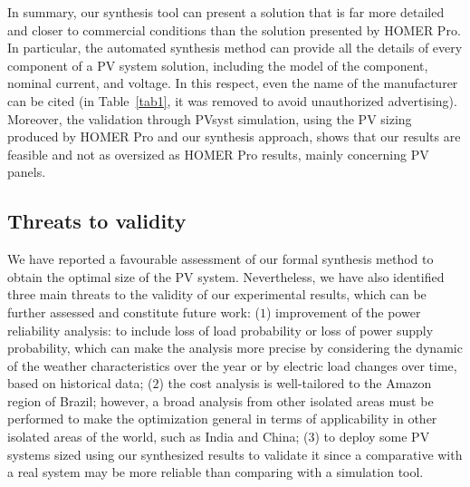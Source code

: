 \documentclass[journal]{IEEEtran}
\begin{document}
In summary, our synthesis tool can present a solution that is far more detailed and closer to commercial conditions than the solution presented by HOMER Pro. In particular, the automated synthesis method can provide all the details of every component of a PV system solution, including the model of the component, nominal current, and voltage. In this respect, even the name of the manufacturer can be cited (in Table~\ref{tab1}, it was removed to avoid unauthorized advertising). Moreover, the validation through PVsyst simulation, using the PV sizing produced by HOMER Pro and our synthesis approach, shows that our results are feasible and not as oversized as HOMER Pro results, mainly concerning PV panels.

\subsection{Threats to validity}
We have reported a favourable assessment of our formal synthesis method to obtain the optimal size of the PV system. Nevertheless, we have also identified three main threats to the validity of our experimental results, which can be further assessed and constitute future work: ($1$) improvement of the power reliability analysis: to include loss of load probability or loss of power supply probability, which can make the analysis more precise by considering the dynamic of the weather characteristics over the year or by electric load changes over time, based on historical data; ($2$) the cost analysis is well-tailored to the Amazon region of Brazil; however, a broad analysis from other isolated areas must be performed to make the optimization general in terms of applicability in other isolated areas of the world, such as India and China; ($3$) to deploy some PV systems sized using our synthesized results to validate it since a comparative with a real system may be more reliable than comparing with a simulation tool.

\end{document}
